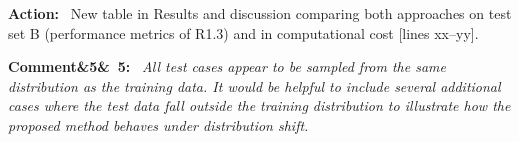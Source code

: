 \documentclass[11pt]{article}
\newenvironment{rcomment}[1]{\par\bigskip\noindent\textbf{Comment\ifx&#1&\else\ #1\fi:}\ \itshape}{\par}
\newenvironment{action}{\par\smallskip\noindent\color{resp}\textbf{Action:}\ }{\par}
\newcommand{\tbd}[1]{\textcolor{note}{\textsf{[#1]}}}
\newcommand{\lines}[1]{\tbd{lines #1}}
\begin{document}
\begin{action}
New table in Results and discussion comparing both approaches on test set B (performance metrics of R1.3)
and in computational cost \lines{xx--yy}.
\end{action}

%
%
%
%
\begin{rcomment}{5}
All test cases appear to be sampled from the same distribution as the training data. It would be helpful to include several additional cases where the test data fall outside the training distribution to illustrate how the proposed method behaves under distribution shift.
\end{rcomment}
\end{document}

